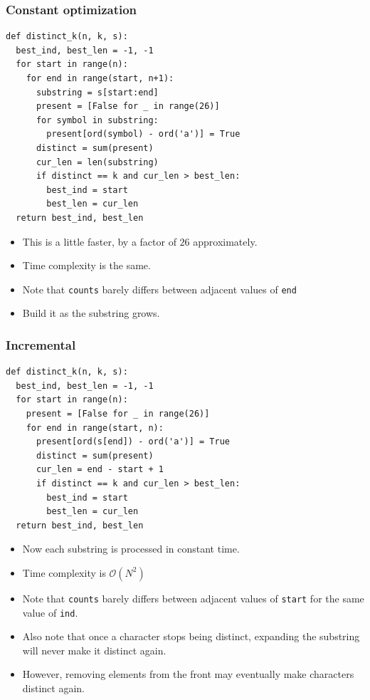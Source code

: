 \documentclass{beamer}
\begin{document}
\begin{frame}
    \frametitle{Constant optimization}
	\begin{scriptsize}
        \begin{verbatim}
def distinct_k(n, k, s):
  best_ind, best_len = -1, -1
  for start in range(n):
    for end in range(start, n+1):
      substring = s[start:end]
      present = [False for _ in range(26)]
      for symbol in substring:
        present[ord(symbol) - ord('a')] = True
      distinct = sum(present)
      cur_len = len(substring)
      if distinct == k and cur_len > best_len:
        best_ind = start
        best_len = cur_len
  return best_ind, best_len
        \end{verbatim}
    \end{scriptsize}
    \begin{itemize}
        \item<2-> This is a little faster, by a factor of $26$ approximately.
        \item<3-> Time complexity is the same.
        \item<4-> Note that \texttt{counts} barely differs between adjacent values of \texttt{end}
        \item<5-> Build it as the substring grows.
    \end{itemize}
\end{frame}

\begin{frame}
    \frametitle{Incremental}
	\begin{scriptsize}
        \begin{verbatim}
def distinct_k(n, k, s):
  best_ind, best_len = -1, -1
  for start in range(n):
    present = [False for _ in range(26)]
    for end in range(start, n):
      present[ord(s[end]) - ord('a')] = True
      distinct = sum(present)
      cur_len = end - start + 1
      if distinct == k and cur_len > best_len:
        best_ind = start
        best_len = cur_len
  return best_ind, best_len
        \end{verbatim}
    \end{scriptsize}
    \begin{itemize}
        \item<2-> Now each substring is processed in constant time.
        \item<3-> Time complexity is $\mathcal{O}(N^2)$
        \item<4-> Note that \texttt{counts} barely differs between adjacent values of \texttt{start} for the same value of \texttt{ind}.
        \item<5-> Also note that once a character stops being distinct, expanding the substring will never make it distinct again.
        \item<6-> However, removing elements from the front may eventually make characters distinct again.
    \end{itemize}
\end{frame}
\end{document}
